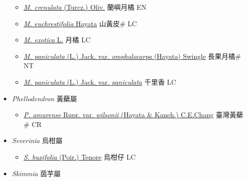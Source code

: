 \begin{itemize}
  \begin{itemize}
        \item[] \href{http://www.theplantlist.org/tpl1.1/search?q=Murraya+crenulata}{\textit{M. crenulata} (Turcz.) Oliv.}   蘭嶼月橘 EN
        \item[] \href{http://www.theplantlist.org/tpl1.1/search?q=Murraya+euchrestifolia}{\textit{M. euchrestifolia} Hayata}   山黃皮\# LC
        \item[] \href{http://www.theplantlist.org/tpl1.1/search?q=Murraya+exotica}{\textit{M. exotica} L.}   月橘 LC
        \item[] \href{http://www.theplantlist.org/tpl1.1/search?q=Murraya+paniculata+var.+omphalocarpa}{\textit{M. paniculata} (L.) Jack. var. \textit{omphalocarpa} (Hayata) Swingle}   長果月橘\# NT
        \item[] \href{http://www.theplantlist.org/tpl1.1/search?q=Murraya+paniculata+var.+paniculata}{\textit{M. paniculata} (L.) Jack. var. \textit{paniculata}}   千里香 LC
  \end{itemize}
 \item[] \textit{Phellodendron} 黃蘗屬
                    
  \begin{itemize}
        \item[] \href{http://www.theplantlist.org/tpl1.1/search?q=Phellodendron+amurense+var.+wilsonii}{\textit{P. amurense} Rupr. var. \textit{wilsonii} (Hayata \& Kaneh.) C.E.Chang}   臺灣黃蘗\# CR
  \end{itemize}
 \item[] \textit{Severinia} 烏柑屬
                    
  \begin{itemize}
        \item[] \href{http://www.theplantlist.org/tpl1.1/search?q=Severinia+buxifolia}{\textit{S. buxifolia} (Poir.) Tenore}   烏柑仔 LC
  \end{itemize}
 \item[] \textit{Skimmia} 茵芋屬
                    

\end{itemize}
